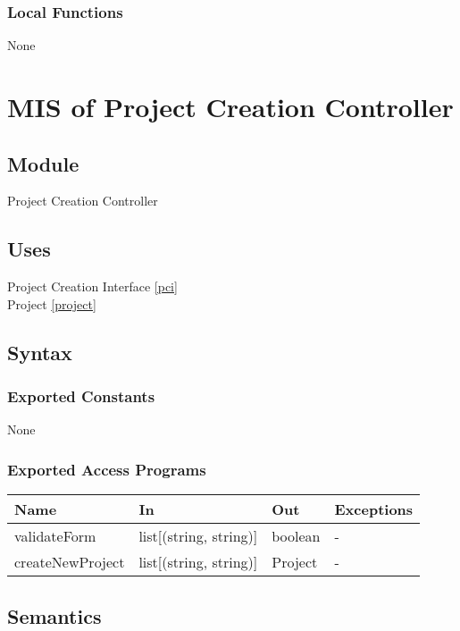 \documentclass[12pt, titlepage]{article}
\begin{document}
\subsubsection{Local Functions}
None

\section{MIS of Project Creation Controller} \label{pcc}

\subsection{Module}

Project Creation Controller

\subsection{Uses}

Project Creation Interface \ref{pci}\\
Project \ref{project} \\

\subsection{Syntax}

\subsubsection{Exported Constants}
None
\subsubsection{Exported Access Programs}

\begin{center}
\begin{tabular}{p{4cm} p{4cm} p{4cm} p{2cm}}
\hline
\textbf{Name} & \textbf{In} & \textbf{Out} & \textbf{Exceptions} \\
\hline
validateForm & list[(string, string)] & boolean & - \\
createNewProject & list[(string, string)] & Project & - \\
\hline
\end{tabular}
\end{center}

\subsection{Semantics}
\end{document}
